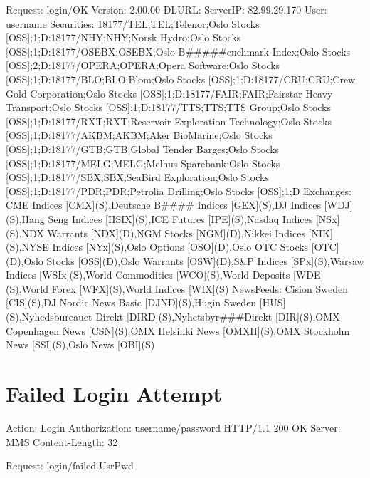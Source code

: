 Request: login/OK
Version: 2.00.00
DLURL: 
ServerIP: 82.99.29.170
User: username
Securities: 18177/TEL;TEL;Telenor;Oslo Stocks [OSS];1;D:18177/NHY;NHY;Norsk Hydro;Oslo Stocks [OSS];1;D:18177/OSEBX;OSEBX;Oslo B#####enchmark Index;Oslo Stocks [OSS];2;D:18177/OPERA;OPERA;Opera Software;Oslo Stocks [OSS];1;D:18177/BLO;BLO;Blom;Oslo Stocks [OSS];1;D:18177/CRU;CRU;Crew Gold Corporation;Oslo Stocks [OSS];1;D:18177/FAIR;FAIR;Fairstar Heavy Transport;Oslo Stocks [OSS];1;D:18177/TTS;TTS;TTS Group;Oslo Stocks [OSS];1;D:18177/RXT;RXT;Reservoir Exploration  Technology;Oslo Stocks [OSS];1;D:18177/AKBM;AKBM;Aker BioMarine;Oslo Stocks [OSS];1;D:18177/GTB;GTB;Global Tender Barges;Oslo Stocks [OSS];1;D:18177/MELG;MELG;Melhus Sparebank;Oslo Stocks [OSS];1;D:18177/SBX;SBX;SeaBird Exploration;Oslo Stocks [OSS];1;D:18177/PDR;PDR;Petrolia Drilling;Oslo Stocks [OSS];1;D
Exchanges: CME Indices [CMX](S),Deutsche B#### Indices [GEX](S),DJ Indices [WDJ](S),Hang Seng Indices [HSIX](S),ICE Futures [IPE](S),Nasdaq Indices [NSx](S),NDX Warrants [NDX](D),NGM Stocks [NGM](D),Nikkei Indices [NIK](S),NYSE Indices [NYx](S),Oslo Options [OSO](D),Oslo OTC Stocks [OTC](D),Oslo Stocks [OSS](D),Oslo Warrants [OSW](D),S&P Indices [SPx](S),Warsaw Indices [WSIx](S),World Commodities [WCO](S),World Deposits [WDE](S),World Forex [WFX](S),World Indices [WIX](S)
NewsFeeds: Cision Sweden [CIS](S),DJ Nordic News Basic [DJND](S),Hugin Sweden [HUS](S),Nyhedsbureauet Direkt [DIRD](S),Nyhetsbyr###Direkt [DIR](S),OMX Copenhagen News [CSN](S),OMX Helsinki News [OMXH](S),OMX Stockholm News [SSI](S),Oslo News [OBI](S)

\section*{Failed Login Attempt}
Action: Login
Authorization: username/password
HTTP/1.1 200 OK
Server: MMS
Content-Length: 32

Request: login/failed.UsrPwd